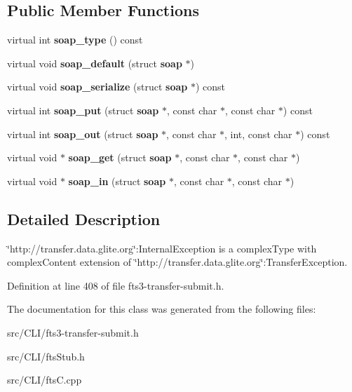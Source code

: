 \subsection*{Public Member Functions}
\begin{DoxyCompactItemize}
\item 
virtual int {\bfseries soap\_\-type} () const \label{classtransfer____InternalException_ad36b4d393190a19a4e40975412f10f49}

\item 
virtual void {\bfseries soap\_\-default} (struct {\bf soap} $\ast$)\label{classtransfer____InternalException_a25c52a9a180076f8990925a704250057}

\item 
virtual void {\bfseries soap\_\-serialize} (struct {\bf soap} $\ast$) const \label{classtransfer____InternalException_a16c4ef97ab32a82a81134209f15cbeef}

\item 
virtual int {\bfseries soap\_\-put} (struct {\bf soap} $\ast$, const char $\ast$, const char $\ast$) const \label{classtransfer____InternalException_a7fd18b08645fdf057124a46636dabb7e}

\item 
virtual int {\bfseries soap\_\-out} (struct {\bf soap} $\ast$, const char $\ast$, int, const char $\ast$) const \label{classtransfer____InternalException_a72c8515e9b66d1811406ea1a7527cb1a}

\item 
virtual void $\ast$ {\bfseries soap\_\-get} (struct {\bf soap} $\ast$, const char $\ast$, const char $\ast$)\label{classtransfer____InternalException_a4c02c9387e0cb377385ae4cf29794082}

\item 
virtual void $\ast$ {\bfseries soap\_\-in} (struct {\bf soap} $\ast$, const char $\ast$, const char $\ast$)\label{classtransfer____InternalException_a1321c2af78292cb5310c3b659e48a758}

\end{DoxyCompactItemize}


\subsection{Detailed Description}
\char`\"{}http://transfer.data.glite.org\char`\"{}:InternalException is a complexType with complexContent extension of \char`\"{}http://transfer.data.glite.org\char`\"{}:TransferException. 

Definition at line 408 of file fts3-\/transfer-\/submit.h.



The documentation for this class was generated from the following files:\begin{DoxyCompactItemize}
\item 
src/CLI/fts3-\/transfer-\/submit.h\item 
src/CLI/ftsStub.h\item 
src/CLI/ftsC.cpp\end{DoxyCompactItemize}
